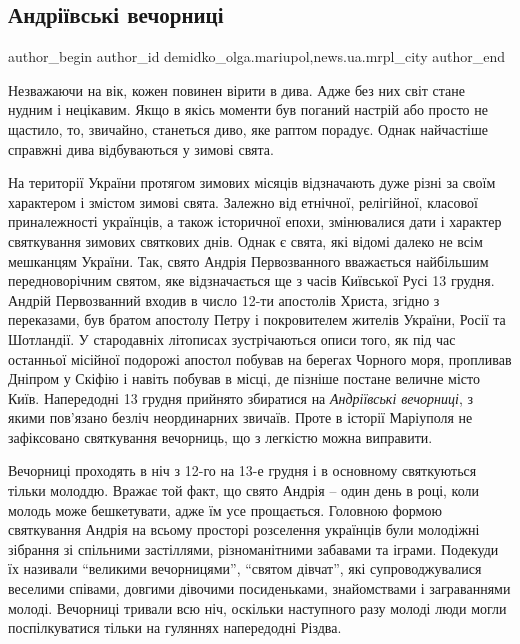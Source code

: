  
 
 
 
 
 
\subsection{Андріївські вечорниці}
\label{sec:12_12_2017.stz.news.ua.mrpl_city.1.andriivski_vechornyci}
 
\ifcmt
 author_begin
   author_id demidko_olga.mariupol,news.ua.mrpl_city
 author_end
\fi

Незважаючи на вік, кожен повинен вірити в дива. Адже без них світ стане нудним
і нецікавим. Якщо в якісь моменти був поганий настрій або просто не щастило,
то, звичайно, станеться диво, яке раптом порадує. Однак найчастіше справжні
дива відбуваються у зимові свята.

На території України протягом зимових місяців відзначають дуже різні за своїм
характером і змістом зимові свята. Залежно від етнічної, релігійної, класової
приналежності українців, а також історичної епохи, змінювалися дати і характер
святкування зимових святкових днів. Однак є свята, які відомі далеко не всім
мешканцям України. Так, свято Андрія Первозванного вважається найбільшим
передноворічним святом, яке відзначається ще з часів Київської Русі 13 грудня.
Андрій Первозванний входив в число 12-ти апостолів Христа, згідно з переказами,
був братом апостолу Петру і покровителем жителів України, Росії та Шотландії. У
стародавніх літописах зустрічаються описи того, як під час останньої місійної
подорожі апостол побував на берегах Чорного моря, пропливав Дніпром у Скіфію і
навіть побував в місці, де пізніше постане величне місто Київ. Напередодні 13
грудня прийнято збиратися на \emph{Андріївські вечорниці}, з якими пов'язано безліч
неординарних звичаїв. Проте в історії Маріуполя не зафіксовано святкування
вечорниць, що з легкістю можна виправити.


Вечорниці проходять в ніч з 12-го на 13-е грудня і в основному святкуються
тільки молоддю. Вражає той факт, що свято Андрія – один день в році, коли
молодь може бешкетувати, адже їм усе прощається. Головною формою святкування
Андрія на всьому просторі розселення українців були молодіжні зібрання зі
спільними застіллями, різноманітними забавами та іграми. Подекуди їх називали
\enquote{великими вечорницями}, \enquote{святом дівчат}, які супроводжувалися веселими співами,
довгими дівочими посиденьками, знайомствами і заграваннями молоді. Вечорниці
тривали всю ніч, оскільки наступного разу молоді люди могли поспілкуватися
тільки на гуляннях напередодні Різдва.

